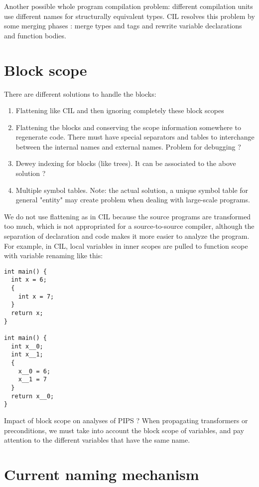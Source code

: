 \documentclass[a4paper]{report}
\begin{document}
Another possible whole program compilation problem: different compilation units use different names for structurally equivalent
 types. CIL \cite{Necu02} resolves this problem by some merging phases : merge types and
 tags and rewrite variable declarations and function bodies.

\section{Block scope}

There are different solutions to handle the blocks:
\begin{enumerate}
\item Flattening like CIL \cite{Necu02} and then ignoring completely these block
  scopes
\item Flattening the blocks and conserving the scope information 
  somewhere to regenerate code. There must have special separators and tables
  to interchange between the internal names and external names. Problem for
  debugging ?
\item Dewey indexing for blocks (like trees). It can be associated to
  the above solution ?
\item Multiple symbol tables. Note: the actual solution, a unique symbol table for general
"entity" may create problem when dealing with large-scale programs. 
\end{enumerate}
We do not use flattening as in CIL because the source
programs are transformed too much, which is not appropriated for a source-to-source
compiler, although the separation of declaration and code makes it more
easier to analyze the program. For example, in CIL, local variables in inner scopes are pulled to
function scope with variable renaming like this: 
\begin{lstlisting}
int main() {
  int x = 6;
  {
    int x = 7;
  }
  return x;
}

int main() {
  int x__0;
  int x__1; 
  {
    x__0 = 6;
    x__1 = 7
  }
  return x__0;
}
\end{lstlisting}
Impact of block scope on analyses of PIPS ? When propagating transformers or
preconditions, we must take into account the block scope of variables, and pay
attention to the different variables that have the same name.  

\section{Current naming mechanism}
\end{document}
